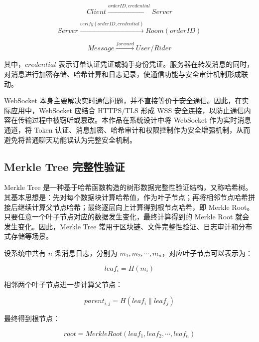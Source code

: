 \documentclass[UTF8,a4paper,zihao=-4,fontset=fandol]{ctexart}
\begin{document}
\begin{equation}
Client \xrightarrow{orderID, credential} Server
\end{equation}

\begin{equation}
Server \xrightarrow{verify(orderID, credential)} Room(orderID)
\end{equation}

\begin{equation}
Message \xrightarrow{forward} User/Rider
\end{equation}

其中，$credential$ 表示订单认证凭证或骑手身份凭证。服务器在转发消息的同时，对消息进行加密存储、哈希计算和日志记录，使通信功能与安全审计机制形成联动。

WebSocket 本身主要解决实时通信问题，并不直接等价于安全通信。因此，在实际应用中，WebSocket 应结合 HTTPS/TLS 形成 WSS 安全连接，以防止通信内容在传输过程中被窃听或篡改。本作品在系统设计中将 WebSocket 作为实时消息通道，将 Token 认证、消息加密、哈希审计和权限控制作为安全增强机制，从而避免将普通聊天功能误认为完整安全机制。

\subsection{Merkle Tree 完整性验证}

Merkle Tree 是一种基于哈希函数构造的树形数据完整性验证结构，又称哈希树。其基本思想是：先对每个数据块计算哈希值，作为叶子节点；再将相邻节点哈希拼接后继续计算父节点哈希；最终逐层向上计算得到根节点哈希，即 Merkle Root。只要任意一个叶子节点对应的数据发生变化，最终计算得到的 Merkle Root 就会发生变化。因此，Merkle Tree 常用于区块链、文件完整性验证、日志审计和分布式存储等场景。

设系统中共有 $n$ 条消息日志，分别为 $m_1,m_2,\cdots,m_n$，对应叶子节点可以表示为：

\begin{equation}
leaf_i = H(m_i)
\end{equation}

相邻两个叶子节点进一步计算父节点：

\begin{equation}
parent_{i,j} = H(leaf_i \parallel leaf_j)
\end{equation}

最终得到根节点：

\begin{equation}
root = MerkleRoot(leaf_1,leaf_2,\cdots,leaf_n)
\end{equation}
\end{document}
